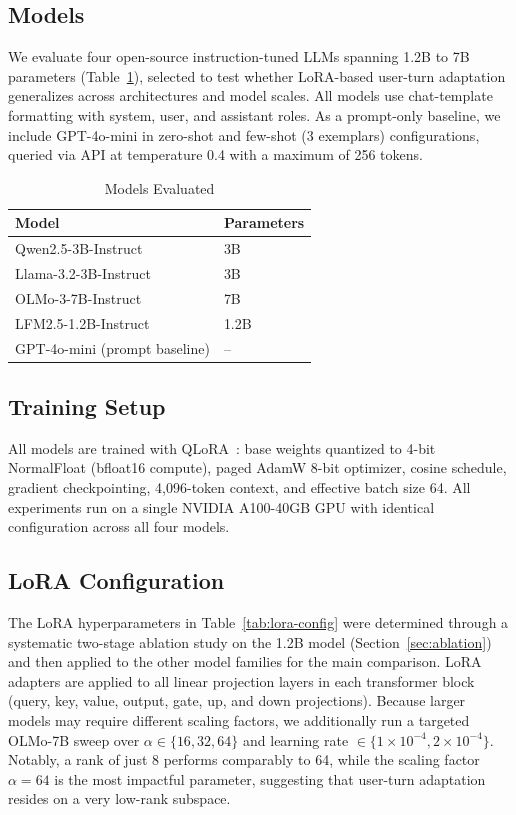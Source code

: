 \documentclass[conference]{IEEEtran}
\begin{document}
\subsection{Models}

We evaluate four open-source instruction-tuned LLMs spanning 1.2B to 7B parameters (Table~\ref{tab:models}), selected to test whether LoRA-based user-turn adaptation generalizes across architectures and model scales. All models use chat-template formatting with system, user, and assistant roles. As a prompt-only baseline, we include GPT-4o-mini in zero-shot and few-shot (3 exemplars) configurations, queried via API at temperature 0.4 with a maximum of 256 tokens.

\begin{table}[ht]
\centering
\caption{Models Evaluated}
\label{tab:models}
\begin{tabular}{ll}
\toprule
\textbf{Model} & \textbf{Parameters} \\
\midrule
Qwen2.5-3B-Instruct & 3B \\
Llama-3.2-3B-Instruct & 3B \\
OLMo-3-7B-Instruct & 7B \\
LFM2.5-1.2B-Instruct & 1.2B \\
\midrule
GPT-4o-mini (prompt baseline) & -- \\
\bottomrule
\end{tabular}
\end{table}

\subsection{Training Setup}

All models are trained with QLoRA~\cite{dettmers2023qlora}: base weights quantized to 4-bit NormalFloat (bfloat16 compute), paged AdamW 8-bit optimizer, cosine schedule, gradient checkpointing, 4{,}096-token context, and effective batch size 64. All experiments run on a single NVIDIA A100-40GB GPU with identical configuration across all four models.

\subsection{LoRA Configuration}

The LoRA hyperparameters in Table~\ref{tab:lora-config} were determined through a systematic two-stage ablation study on the 1.2B model (Section~\ref{sec:ablation}) and then applied to the other model families for the main comparison. LoRA adapters are applied to all linear projection layers in each transformer block (query, key, value, output, gate, up, and down projections). Because larger models may require different scaling factors, we additionally run a targeted OLMo-7B sweep over $\alpha \in \{16,32,64\}$ and learning rate $\in \{1{\times}10^{-4},2{\times}10^{-4}\}$. Notably, a rank of just 8 performs comparably to 64, while the scaling factor $\alpha = 64$ is the most impactful parameter, suggesting that user-turn adaptation resides on a very low-rank subspace.
\end{document}
